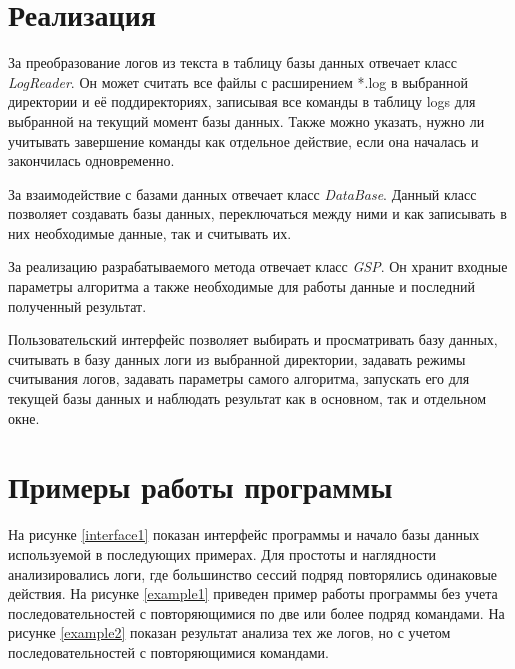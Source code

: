 \section{Реализация}
За преобразование логов из текста в таблицу базы данных отвечает класс \textit{LogReader}.
Он может считать все файлы с расширением *.log в выбранной директории и её поддиректориях, записывая все команды в таблицу logs для выбранной на текущий момент базы данных. Также можно указать, нужно ли учитывать завершение команды как отдельное действие, если она началась и закончилась одновременно.

За взаимодействие с базами данных отвечает класс \textit{DataBase}.
Данный класс позволяет создавать базы данных,
переключаться между ними и как записывать в них необходимые данные, так и считывать их.

За реализацию разрабатываемого метода отвечает
класс \textit{GSP}.
Он хранит входные параметры алгоритма а также необходимые для работы данные и последний полученный результат.

Пользовательский интерфейс позволяет выбирать и просматривать базу данных, считывать в базу данных логи из выбранной директории, задавать режимы считывания логов, задавать параметры самого алгоритма, запускать его для текущей базы данных и наблюдать результат как в основном, так и отдельном окне.

\section{Примеры работы программы}

На рисунке \ref{interface1} показан интерфейс программы и начало базы данных используемой в последующих примерах.
Для простоты и наглядности анализировались логи, где большинство сессий подряд повторялись одинаковые действия. На рисунке \ref{example1} приведен пример работы программы без учета последовательностей с повторяющимися по две или более подряд командами. На рисунке \ref{example2} показан результат анализа тех же логов, но с учетом последовательностей с повторяющимися командами.

